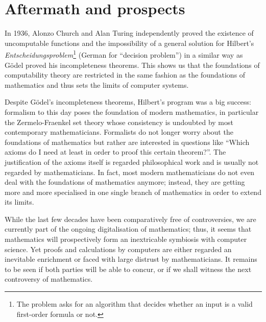 \documentclass[hidelinks]{article}
\begin{document}
\section{Aftermath and prospects}
In 1936, Alonzo Church and Alan Turing independently proved the existence of uncomputable functions and the impossibility of a general solution for Hilbert's \textit{Entscheidungspro\-blem}\footnote{The problem asks for an algorithm that decides whether an input is a valid first-order formula or not.} (German for ``decision problem'') in a similar way as Gödel proved his incompleteness theorems. This shows us that the foundations of computability theory are restricted in the same fashion as the foundations of mathematics and thus sets the limits of computer systems.

Despite Gödel's incompleteness theorems, Hilbert's program was a big success: formalism to this day poses the foundation of modern mathematics, in particular the Zermelo-Fraenkel set theory whose consistency is undoubted by most contemporary mathematicians.  
Formalists do not longer worry about the foundations of mathematics but rather are interested in questions like ``Which axioms do I need at least in order to proof this certain theorem?''. The justification of the axioms itself is regarded philosophical work and is usually not regarded by mathematicians. In fact, most modern mathematicians do not even deal with the foundations of mathematics anymore; instead, they are getting more and more specialised in one single branch of mathematics in order to extend its limits.

While the last few decades have been comparatively free of controversies, we are currently part of the ongoing digitalisation of mathematics; thus, it seems that mathematics will prospectively form an inextricable symbiosis with computer science. Yet proofs and calculations by computers are either regarded an inevitable enrichment or faced with large distrust by mathematicians. It remains to be seen if both parties will be able to concur, or if we shall witness the next controversy of mathematics.

\newpage


\end{document}
